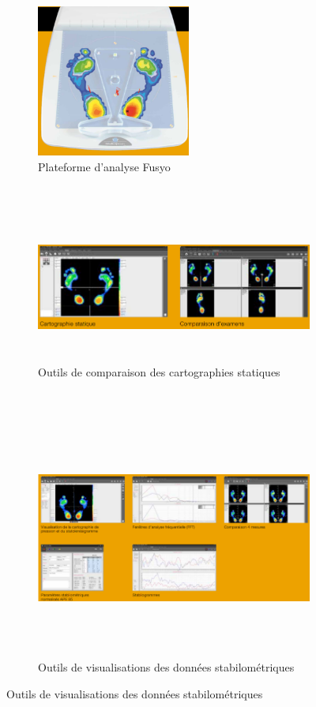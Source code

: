\begin{figure}[H]
    \centering
    \begin{subfigure}[b]{0.45\textwidth}
        \centering
      \includegraphics[height=5cm]{images/analyse_marche/Fusyo_1.png}
      \caption{Plateforme d'analyse Fusyo}\label{fig:Fusyo_1}
    \end{subfigure}\\
    \begin{subfigure}[b]{0.45\textwidth}
        \hspace{-4.5cm}
        \includegraphics[height=5cm]{images/analyse_marche/Fusyo_2.png}
        \caption{Outils de comparaison des cartographies statiques}\label{fig:Fusyo_2}
    \end{subfigure}\\
    \begin{subfigure}[b]{0.45\textwidth}
        \hspace{-5cm}
        \includegraphics[height=8cm]{images/analyse_marche/Fusyo_4.png}
        \caption{Outils de visualisations des données stabilométriques}\label{fig:Fusyo_4}
    \end{subfigure}
\end{figure}

